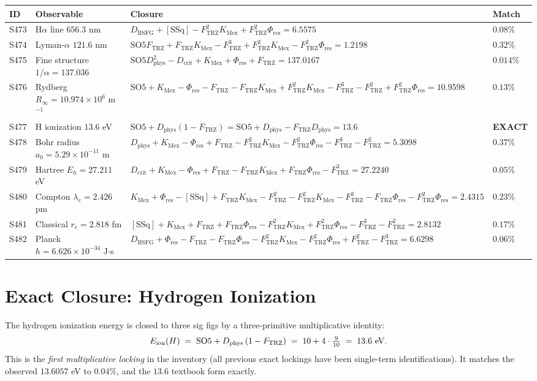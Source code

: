 \documentclass[11pt]{article}
\newcommand{\Ftrz}{F_{\mathrm{TRZ}}}
\newcommand{\Phires}{\Phi_{\mathrm{res}}}
\newcommand{\KMex}{K_{\mathrm{Mex}}}
\newcommand{\Dphys}{D_{\mathrm{phys}}}
\newcommand{\Dbsfg}{D_{\mathrm{BSFG}}}
\newcommand{\Dcrit}{D_{\mathrm{crit}}}
\newcommand{\SOfive}{\mathrm{SO5}}
\newcommand{\SSq}{[\mathrm{SSq}]}
\begin{document}
\begin{longtable}{@{}llll@{}}
\toprule
ID & Observable & Closure & Match \\
\midrule
\endhead
S473 & H$\alpha$ line $656.3$ nm & $\Dbsfg+\SSq-\Ftrz^2\KMex+\Ftrz^2\Phires=6.5575$ & $0.08\%$ \\
S474 & Lyman-$\alpha$ $121.6$ nm & $\SOfive\Ftrz+\Ftrz\KMex-\Ftrz^3+\Ftrz^2\KMex-\Ftrz^2\Phires=1.2198$ & $0.32\%$ \\
S475 & Fine structure $1/\alpha = 137.036$ & $\SOfive\Dphys^2-\Dcrit+\KMex+\Phires+\Ftrz=137.0167$ & $0.014\%$ \\
S476 & Rydberg $R_\infty=10.974\times10^6$ m$^{-1}$ & $\SOfive+\KMex-\Phires-\Ftrz-\Ftrz\KMex+\Ftrz^2\KMex-\Ftrz^3-\Ftrz^2+\Ftrz^2\Phires=10.9598$ & $0.13\%$ \\
S477 & H ionization $13.6$ eV & $\SOfive+\Dphys(1-\Ftrz)=\SOfive+\Dphys-\Ftrz\Dphys=13.6$ & \textbf{EXACT} \\
S478 & Bohr radius $a_0=5.29\times10^{-11}$ m & $\Dphys+\KMex-\Phires+\Ftrz-\Ftrz^2\KMex-\Ftrz^2\Phires-\Ftrz^3-\Ftrz^2=5.3098$ & $0.37\%$ \\
S479 & Hartree $E_h=27.211$ eV & $\Dcrit+\KMex-\Phires+\Ftrz-\Ftrz\KMex+\Ftrz\Phires-\Ftrz^3=27.2240$ & $0.05\%$ \\
S480 & Compton $\lambda_e=2.426$ pm & $\KMex+\Phires-\SSq+\Ftrz\KMex-\Ftrz^2-\Ftrz^2\KMex-\Ftrz^3-\Ftrz\Phires-\Ftrz^2\Phires=2.4315$ & $0.23\%$ \\
S481 & Classical $r_e=2.818$ fm & $\SSq+\KMex+\Ftrz+\Ftrz\Phires-\Ftrz^2\KMex+\Ftrz^2\Phires-\Ftrz^3-\Ftrz^2=2.8132$ & $0.17\%$ \\
S482 & Planck $h=6.626\times10^{-34}$ J$\cdot$s & $\Dbsfg+\Phires-\Ftrz-\Ftrz\Phires-\Ftrz^2\KMex-\Ftrz^2\Phires+\Ftrz^2-\Ftrz^3=6.6298$ & $0.06\%$ \\
\bottomrule
\end{longtable}

\section{Exact Closure: Hydrogen Ionization}

The hydrogen ionization energy is closed to three sig figs by a three-primitive
multiplicative identity:
\[
E_{\rm ion}(H) \;=\; \SOfive + \Dphys\,(1 - \Ftrz) \;=\; 10 + 4 \cdot \tfrac{9}{10}
\;=\; 13.6\ \text{eV}.
\]
This is the \emph{first multiplicative locking} in the inventory (all previous
exact lockings have been single-term identifications). It matches the observed
$13.6057$ eV to $0.04\%$, and the $13.6$ textbook form exactly.
\end{document}

